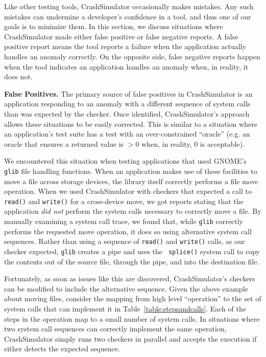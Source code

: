 Like other testing tools, CrashSimulator occasionally makes mistakes.
Any such mistakes can
undermine a developer's confidence in a tool, and thus one of our goals is
to minimize them.   In this section, we discuss
situations where CrashSimulator made either false positive or false
negative reports.  A false positive report means the tool reports
a failure when the application actually handles an anomaly correctly.
On the opposite side, false negative reports happen when the tool indicates an application handles
an anomaly when, in reality, it does not.

\textbf{False Positives.}
The primary source of false positives in CrashSimulator is an application
responding to an anomaly with a different sequence of system calls
than was expected by the checker.
Once identified, CrashSimulator's approach allows these
situations to be easily corrected.
This is similar to a situation
where an application's test suite
has a test with an over-constrained ``oracle''
(e.g. an oracle that ensures a returned value is $>0$ when, in reality,
$0$ is acceptable).

We encountered this situation when testing applications that used
GNOME's {\tt glib} file handling functions.  When an
application makes use of these facilities to move a file across storage
devices, the library itself correctly performs a
file move operation.  When we used CrashSimulator with
checkers that expected a call to {\tt read()} and {\tt write()}
for a cross-device move, we got reports stating that the
application {\em did not} perform the system calls necessary to
correctly move a file.
By manually
examining a system call trace, we found that, while {\tt glib} correctly
performs the requested move operation,
it does so using alternative system call
sequences.  Rather than using a sequence of {\tt read()} and {\tt write()}
calls, as our checker expected, {\tt glib} creates a pipe and uses the {\tt
splice()} system call to copy the contents out of the source file, through
the pipe, and into the destination file.

Fortunately, as soon as issues like this are discovered,
CrashSimulator's checkers can be modified to include the alternative
sequence.
Given the above example about moving
files, consider the mapping from high level ``operation'' to the set of
system calls that can implement it in Table~\ref{table:stepsandcalls}.
Each of the steps in the operation map to a small number of system calls.
In
situations where two system call sequences can correctly implement the same
operation, CrashSimulator simply runs two checkers in parallel
and accepts the execution if either detects the expected sequence.

